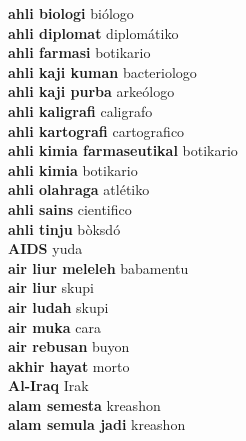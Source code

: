 \textbf{ ahli biologi  } biólogo \\
\textbf{ ahli diplomat  } diplomátiko \\
\textbf{ ahli farmasi  } botikario \\
\textbf{ ahli kaji kuman  } bacteriologo \\
\textbf{ ahli kaji purba  } arkeólogo \\
\textbf{ ahli kaligrafi  } caligrafo \\
\textbf{ ahli kartografi  } cartografico \\
\textbf{ ahli kimia farmaseutikal  } botikario \\
\textbf{ ahli kimia  } botikario \\
\textbf{ ahli olahraga  } atlétiko \\
\textbf{ ahli sains  } cientifico \\
\textbf{ ahli tinju  } bòksdó \\
\textbf{ AIDS  } yuda \\
\textbf{ air liur meleleh  } babamentu \\
\textbf{ air liur  } skupi \\
\textbf{ air ludah  } skupi \\
\textbf{ air muka  } cara \\
\textbf{ air rebusan  } buyon \\
\textbf{ akhir hayat  } morto \\
\textbf{ Al-Iraq  } Irak \\
\textbf{ alam semesta  } kreashon \\
\textbf{ alam semula jadi  } kreashon \\
